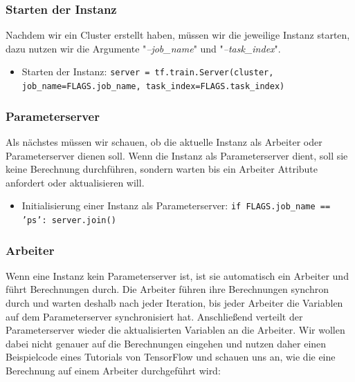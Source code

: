 \vspace{2mm}
\subsubsection{Starten der Instanz}
Nachdem wir ein Cluster erstellt haben, müssen wir die jeweilige Instanz starten, dazu nutzen wir die Argumente "\textit{--job\_name}" und "\textit{--task\_index}".
\begin{itemize}
	\item Starten der Instanz: \newline
		\texttt{server = tf.train.Server(cluster,
				job\_name=FLAGS.job\_name,	
				task\_index=FLAGS.task\_index)}
\end{itemize}

\vspace{2mm}
\subsubsection{Parameterserver}
Als nächstes müssen wir schauen, ob die aktuelle Instanz als Arbeiter oder Parameterserver dienen soll. Wenn die Instanz als Parameterserver dient, soll sie keine Berechnung durchführen, sondern warten bis ein Arbeiter Attribute anfordert oder aktualisieren will.
\begin{itemize}
	\item Initialisierung einer Instanz als Parameterserver: \newline
		\texttt{if FLAGS.job\_name == 'ps': 
			server.join()}
\end{itemize}

\vspace{2mm}
\subsubsection{Arbeiter}
Wenn eine Instanz kein Parameterserver ist, ist sie automatisch ein Arbeiter und führt Berechnungen durch. Die Arbeiter führen ihre Berechnungen synchron durch und warten deshalb nach jeder Iteration, bis jeder Arbeiter die Variablen auf dem Parameterserver synchronisiert hat. Anschließend verteilt der Parameterserver wieder die aktualisierten Variablen an die Arbeiter. Wir wollen dabei nicht genauer auf die Berechnungen eingehen und nutzen daher einen Beispielcode eines Tutorials von TensorFlow und schauen uns an, wie die eine Berechnung auf einem Arbeiter durchgeführt wird:

